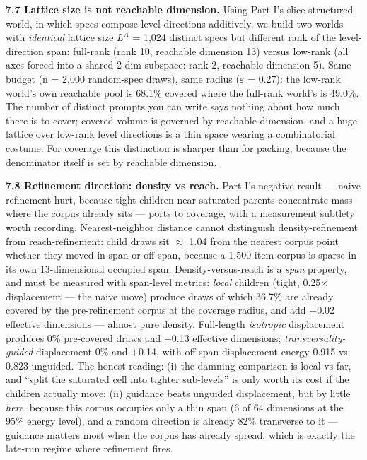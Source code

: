 \documentclass[11pt]{article}
\theoremstyle{plain}
\theoremstyle{definition}
\begin{document}
\textbf{7.7 Lattice size is not reachable dimension.} Using Part I's slice-structured world, in which specs compose level directions additively, we build two worlds with \emph{identical} lattice size $L^{A}$ = 1,024 distinct specs but different rank of the level-direction span: full-rank (rank 10, reachable dimension 13) versus low-rank (all axes forced into a shared 2-dim subspace: rank 2, reachable dimension 5). Same budget (n = 2,000 random-spec draws), same radius ($\varepsilon$ = 0.27): the low-rank world's own reachable pool is 68.1\% covered where the full-rank world's is 49.0\%. The number of distinct prompts you can write says nothing about how much there is to cover; covered volume is governed by reachable dimension, and a huge lattice over low-rank level directions is a thin space wearing a combinatorial costume. For coverage this distinction is sharper than for packing, because the denominator itself is set by reachable dimension.

\textbf{7.8 Refinement direction: density vs reach.} Part I's negative result --- naive refinement hurt, because tight children near saturated parents concentrate mass where the corpus already sits --- ports to coverage, with a measurement subtlety worth recording. Nearest-neighbor distance cannot distinguish density-refinement from reach-refinement: child draws sit $\approx$ 1.04 from the nearest corpus point whether they moved in-span or off-span, because a 1,500-item corpus is sparse in its own 13-dimensional occupied span. Density-versus-reach is a \emph{span} property, and must be measured with span-level metrics: \emph{local} children (tight, 0.25$\times$ displacement --- the naive move) produce draws of which 36.7\% are already covered by the pre-refinement corpus at the coverage radius, and add +0.02 effective dimensions --- almost pure density. Full-length \emph{isotropic} displacement produces 0\% pre-covered draws and +0.13 effective dimensions; \emph{transversality-guided} displacement 0\% and +0.14, with off-span displacement energy 0.915 vs 0.823 unguided. The honest reading: (i) the damning comparison is local-vs-far, and ``split the saturated cell into tighter sub-levels'' is only worth its cost if the children actually move; (ii) guidance beats unguided displacement, but by little \emph{here}, because this corpus occupies only a thin span (6 of 64 dimensions at the 95\% energy level), and a random direction is already 82\% transverse to it --- guidance matters most when the corpus has already spread, which is exactly the late-run regime where refinement fires.
\end{document}
